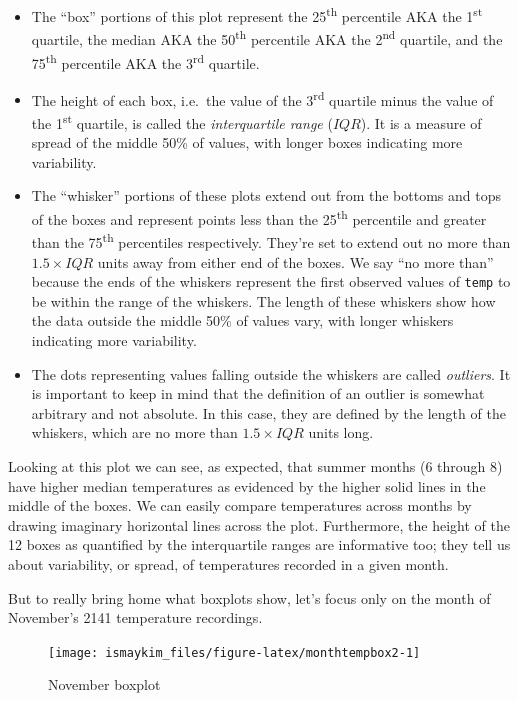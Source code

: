 \documentclass[12pt,]{krantz}
\providecommand{\tightlist}{%
  \setlength{\itemsep}{0pt}\setlength{\parskip}{0pt}}
\theoremstyle{definition}
\theoremstyle{definition}
\theoremstyle{definition}
\theoremstyle{remark}
\begin{document}
\begin{itemize}
\tightlist
\item
  The ``box'' portions of this plot represent the 25\textsuperscript{th}
  percentile AKA the 1\textsuperscript{st} quartile, the median AKA the
  50\textsuperscript{th} percentile AKA the 2\textsuperscript{nd}
  quartile, and the 75\textsuperscript{th} percentile AKA the
  3\textsuperscript{rd} quartile.
\item
  The height of each box, i.e.~the value of the 3\textsuperscript{rd}
  quartile minus the value of the 1\textsuperscript{st} quartile, is
  called the \emph{interquartile range} (\(IQR\)). It is a measure of
  spread of the middle 50\% of values, with longer boxes indicating more
  variability.
\item
  The ``whisker'' portions of these plots extend out from the bottoms
  and tops of the boxes and represent points less than the
  25\textsuperscript{th} percentile and greater than the
  75\textsuperscript{th} percentiles respectively. They're set to extend
  out no more than \(1.5 \times IQR\) units away from either end of the
  boxes. We say ``no more than'' because the ends of the whiskers
  represent the first observed values of \texttt{temp} to be within the
  range of the whiskers. The length of these whiskers show how the data
  outside the middle 50\% of values vary, with longer whiskers
  indicating more variability.
\item
  The dots representing values falling outside the whiskers are called
  \emph{outliers}. It is important to keep in mind that the definition
  of an outlier is somewhat arbitrary and not absolute. In this case,
  they are defined by the length of the whiskers, which are no more than
  \(1.5 \times IQR\) units long.
\end{itemize}

Looking at this plot we can see, as expected, that summer months (6
through 8) have higher median temperatures as evidenced by the higher
solid lines in the middle of the boxes. We can easily compare
temperatures across months by drawing imaginary horizontal lines across
the plot. Furthermore, the height of the 12 boxes as quantified by the
interquartile ranges are informative too; they tell us about
variability, or spread, of temperatures recorded in a given month.

But to really bring home what boxplots show, let's focus only on the
month of November's 2141 temperature recordings.

\begin{figure}

{\centering \texttt{[image: ismaykim\_files/figure-latex/monthtempbox2-1]} 

}

\caption{November boxplot}\label{fig:monthtempbox2}
\end{figure}
\end{document}
